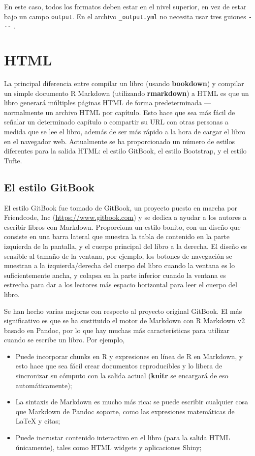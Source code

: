 \documentclass[12pt,]{krantz}
\providecommand{\tightlist}{%
  \setlength{\itemsep}{0pt}\setlength{\parskip}{0pt}}
\theoremstyle{definition}
\theoremstyle{definition}
\theoremstyle{definition}
\theoremstyle{remark}
\begin{document}
En este caso, todos los formatos deben estar en el nivel superior, en
vez de estar bajo un campo \texttt{output}. En el archivo
\texttt{\_output.yml} no necesita usar tres guiones \texttt{-\/-\/-} .

\section{HTML}\label{html}

La principal diferencia entre compilar un libro (usando
\textbf{bookdown}) y compilar un simple documento R Markdown (utilizando
\textbf{rmarkdown}) a HTML es que un libro generará múltiples páginas
HTML de forma predeterminada --- normalmente un archivo HTML por
capítulo. Esto hace que sea más fácil de señalar un determinado capítulo
o compartir su URL con otras personas a medida que se lee el libro,
además de ser más rápido a la hora de cargar el libro en el navegador
web. Actualmente se ha proporcionado un número de estilos diferentes
para la salida HTML: el estilo GitBook, el estilo Bootstrap, y el estilo
Tufte.

\subsection{El estilo GitBook}\label{estilo-gitbook}

El estilo GitBook fue tomado de GitBook, un proyecto puesto en marcha
por Friendcode, Inc (\url{https://www.gitbook.com}) y se dedica a ayudar
a los autores a escribir libros con Markdown. Proporciona un estilo
bonito, con un diseño que consiste en una barra lateral que muestra la
tabla de contenido en la parte izquierda de la pantalla, y el cuerpo
principal del libro a la derecha. El diseño es sensible al tamaño de la
ventana, por ejemplo, los botones de navegación se muestran a la
izquierda/derecha del cuerpo del libro cuando la ventana es lo
suficientemente ancha, y colapsa en la parte inferior cuando la ventana
es estrecha para dar a los lectores más espacio horizontal para leer el
cuerpo del libro.

Se han hecho varias mejoras con respecto al proyecto original GitBook.
El más significativo es que se ha sustituido el motor de Markdown con R
Markdown v2 basado en Pandoc, por lo que hay muchas más características
para utilizar cuando se escribe un libro. Por ejemplo,

\begin{itemize}
\tightlist
\item
  Puede incorporar chunks en R y expresiones en línea de R en Markdown,
  y esto hace que sea fácil crear documentos reproducibles y lo libera
  de sincronizar su cómputo con la salida actual (\textbf{knitr} se
  encargará de eso automáticamente);
\item
  La sintaxis de Markdown es mucho más rica: se puede escribir cualquier
  cosa que Markdown de Pandoc soporte, como las expresiones matemáticas
  de LaTeX y citas;
\item
  Puede incrustar contenido interactivo en el libro (para la salida HTML
  únicamente), tales como HTML widgets y aplicaciones Shiny;
\end{itemize}
\end{document}

